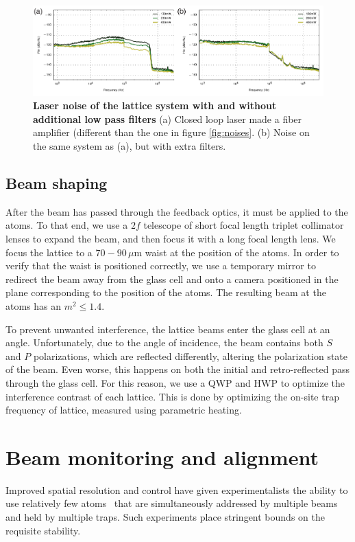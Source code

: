 \documentclass[twocolumn,aps,pra,showpacs,preprintnumbers,bibnotes]{revtex4-1}
\begin{document}
\begin{figure}
  \begin{center}
    \includegraphics{fig/low_pass_filters.pdf}
    \caption{\textbf{Laser noise of the lattice system with and without additional low pass filters} (a) Closed loop laser made a fiber amplifier (different than the one in figure \ref{fig:noises}. (b) Noise on the same system as (a), but with extra filters.}\label{fig:low_pass_noises}
  \end{center}
\end{figure}


\subsection{Beam shaping}
After the beam has passed through the feedback optics, it must be applied to the atoms. To that end, we use a $2f$ telescope of short focal length triplet collimator lenses to expand the beam, and then focus it with a long focal length lens.
We focus the lattice to a $70-90$\,$\mu$m waist at the position of the atoms.
In order to verify that the waist is positioned correctly, we use a temporary mirror to redirect the beam away from the glass cell and onto a camera positioned in the plane corresponding to the position of the atoms.
The resulting beam at the atoms has an $m^2\leq1.4$.

To prevent unwanted interference, the lattice beams enter the glass cell at an angle. 
Unfortunately, due to the angle of incidence, the beam contains both $S$ and $P$ polarizations, which are reflected differently, altering the polarization state of the beam.
Even worse, this happens on both the initial and retro-reflected pass through the glass cell.
For this reason, we use a QWP and HWP to optimize the interference contrast of each lattice.
This is done by optimizing the on-site trap frequency of lattice, measured using parametric heating.

\section{Beam monitoring and alignment}
Improved spatial resolution and control have given experimentalists the ability to use relatively few atoms~\cite{Preiss2015, Choi2016, Mazurenko2016} that are simultaneously addressed by multiple beams and held by multiple traps.
Such experiments place stringent bounds on the requisite stability. 
\end{document}
